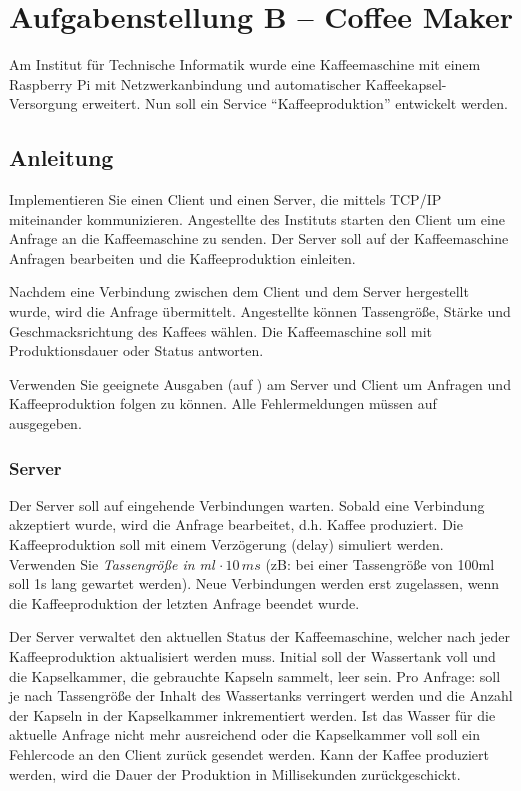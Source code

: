 



\section*{Aufgabenstellung B -- Coffee Maker}\label{sec:aufgabenstellung}

Am Institut für Technische Informatik wurde eine Kaffeemaschine mit einem
Raspberry Pi mit Netzwerkanbindung und automatischer Kaffeekapsel-Versorgung
erweitert. Nun soll ein Service ``Kaffeeproduktion'' entwickelt werden.

\subsection*{Anleitung}
Implementieren Sie einen Client und einen Server, die mittels TCP/IP
miteinander kommunizieren. Angestellte des Instituts starten den Client um eine
Anfrage an die Kaffeemaschine zu senden. Der Server soll auf der Kaffeemaschine
Anfragen bearbeiten und die Kaffeeproduktion einleiten.

Nachdem eine Verbindung zwischen dem Client und dem Server hergestellt wurde,
wird die Anfrage übermittelt. Angestellte können Tassengröße, Stärke und
Geschmacksrichtung des Kaffees wählen. Die Kaffeemaschine soll mit
Produktionsdauer oder Status antworten.

Verwenden Sie geeignete Ausgaben (auf ) am Server und Client
um Anfragen und Kaffeeproduktion folgen zu können. Alle Fehlermeldungen müssen
auf  ausgegeben.

\subsubsection*{Server}
Der Server soll auf eingehende Verbindungen warten. Sobald eine Verbindung
akzeptiert wurde, wird die Anfrage bearbeitet, d.h. Kaffee produziert. Die
Kaffeeproduktion soll mit einem Verzögerung (delay) simuliert werden. Verwenden
Sie \emph{Tassengröße in ml} $\cdot \, 10 \, ms$ (zB: bei einer Tassengröße von
100ml soll 1s lang gewartet werden). Neue Verbindungen werden erst zugelassen,
wenn die Kaffeeproduktion der letzten Anfrage beendet wurde.

Der Server verwaltet den aktuellen Status der Kaffeemaschine, welcher nach
jeder Kaffeeproduktion aktualisiert werden muss. Initial soll der Wassertank
voll und die Kapselkammer, die gebrauchte Kapseln sammelt, leer sein. Pro
Anfrage: soll je nach Tassengröße der Inhalt des Wassertanks verringert werden
und die Anzahl der Kapseln in der Kapselkammer inkrementiert werden. Ist das
Wasser für die aktuelle Anfrage nicht mehr ausreichend oder die Kapselkammer
voll soll ein Fehlercode an den Client zurück gesendet werden. Kann der Kaffee
produziert werden, wird die Dauer der Produktion in Millisekunden
zurückgeschickt.

